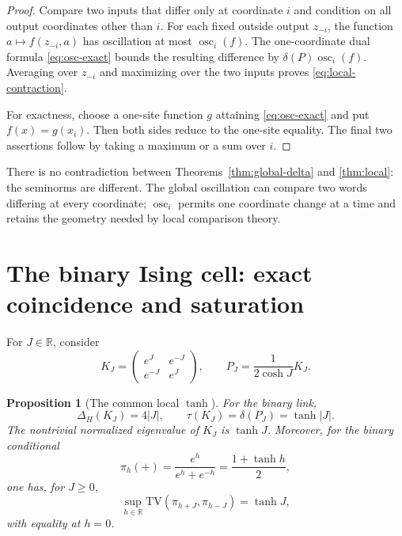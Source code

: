 \documentclass[11pt]{article}
\newtheorem{proposition}[theorem]{Proposition}
\newcommand{\TV}{\mathrm{TV}}
\newcommand{\osc}{\operatorname{osc}}
\newcommand{\diamH}{\Delta_{H}}
\newcommand{\R}{\mathbb{R}}
\newcommand{\1}{\mathbf{1}}
\begin{document}
\begin{proof}
Compare two inputs that differ only at coordinate $i$ and condition on all
output coordinates other than $i$.  For each fixed outside output $z_{-i}$,
the function $a\mapsto f(z_{-i},a)$ has oscillation at most $\osc_i(f)$.
The one-coordinate dual formula \eqref{eq:osc-exact} bounds the resulting
difference by $\delta(P)\osc_i(f)$.  Averaging over $z_{-i}$ and maximizing
over the two inputs proves \eqref{eq:local-contraction}.

For exactness, choose a one-site function $g$ attaining
\eqref{eq:osc-exact} and put $f(x)=g(x_i)$.  Then both sides reduce to the
one-site equality.  The final two assertions follow by taking a maximum or a
sum over $i$.
\end{proof}

There is no contradiction between Theorems~\ref{thm:global-delta} and
\ref{thm:local}: the seminorms are different.  The global oscillation can
compare two words differing at every coordinate; $\osc_i$ permits one
coordinate change at a time and retains the geometry needed by local
comparison theory.

\section{The binary Ising cell: exact coincidence and saturation}

For $J\in\R$, consider
\begin{equation}\label{eq:ising-link}
 K_J=\begin{pmatrix}e^J&e^{-J}\\ e^{-J}&e^J\end{pmatrix},
 \qquad P_J=\frac1{2\cosh J}K_J.
\end{equation}

\begin{proposition}[The common local $\tanh$]\label{prop:ising}
For the binary link,
\begin{equation}\label{eq:ising-coincidence}
 \diamH(K_J)=4|J|,\qquad
 \tau(K_J)=\delta(P_J)=\tanh|J|.
\end{equation}
The nontrivial normalized eigenvalue of $K_J$ is $\tanh J$.  Moreover, for
the binary conditional
\[
 \pi_h(+)=\frac{e^h}{e^h+e^{-h}}=\frac{1+\tanh h}{2},
\]
one has, for $J\geq0$,
\begin{equation}\label{eq:conditional-envelope}
 \sup_{h\in\R}\TV(\pi_{h+J},\pi_{h-J})=\tanh J,
\end{equation}
with equality at $h=0$.
\end{proposition}
\end{document}
